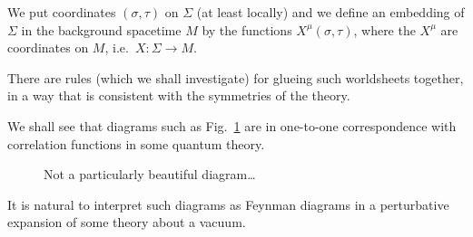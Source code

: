 We put coordinates $(\sigma, \tau)$  on $\Sigma$  (at least locally) and we define an embedding of $\Sigma$ in the background spacetime $M$ by the functions $X^{\mu}(\sigma, \tau)$, where the $X^{\mu}$ are coordinates on $M$, i.e.~$X \colon \Sigma \to M$.

There are rules (which we shall investigate) for glueing such worldsheets together, in a way that is consistent with the symmetries of the theory.

We shall see that diagrams such as Fig.~\ref{fig:l1f2} are in one-to-one correspondence with correlation functions in some quantum theory.
\begin{figure}[tbhp]
  \centering
  \def\svgwidth{0.4\columnwidth}
  
  \caption{Not a particularly beautiful diagram\dots}
  \label{fig:l1f2}
\end{figure}
It is natural to interpret such diagrams as Feynman diagrams in a perturbative expansion of some theory about a vacuum.
